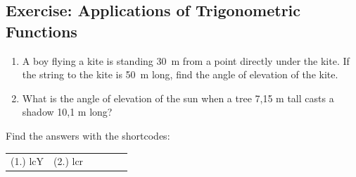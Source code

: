             \subsection{ Exercise: Applications of Trigonometric Functions }
            \nopagebreak
        \label{m39411*id83420}\begin{enumerate}[noitemsep, label=\textbf{\arabic*}. ] 
            \label{m39411*uid28}\item A boy flying a kite is standing 30~m from a point directly under the
kite. If the string to the kite is 50~m long, find the angle of
elevation of the kite.\newline
\label{m39411*uid29}\item What is the angle of elevation of the sun when a tree 7,15 m tall
casts a shadow 10,1 m long?\newline
\end{enumerate}
  \label{m39411**end}
\par {} Find the answers with the shortcodes:
 \par \begin{tabular}[h]{cccccc}
 (1.) lcY  &  (2.) lcr  & \end{tabular}
% 
%     
%     
%     
